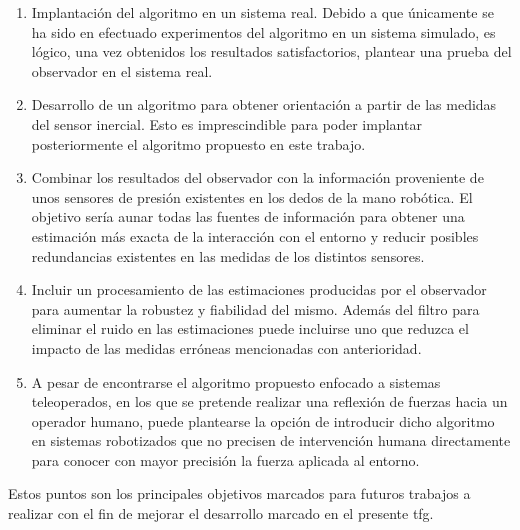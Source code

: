 \begin{enumerate}

\item Implantación del algoritmo en un sistema real. Debido a que únicamente se ha sido en efectuado experimentos del algoritmo en un sistema simulado, es lógico, una vez obtenidos los resultados satisfactorios, plantear una prueba del observador en el sistema real. \par 

\item Desarrollo de un algoritmo para obtener orientación a partir de las medidas del sensor inercial. Esto es imprescindible para poder implantar posteriormente el algoritmo propuesto en este trabajo. \par 

\item Combinar los resultados del observador con la información proveniente de unos sensores de presión existentes en los dedos de la mano robótica. El objetivo sería aunar todas las fuentes de información para obtener una estimación más exacta de la interacción con el entorno y reducir posibles redundancias existentes en las medidas de los distintos sensores. \par 

\item Incluir un procesamiento de las estimaciones producidas por el observador para aumentar la robustez y fiabilidad del mismo. Además del filtro para eliminar el ruido en las estimaciones puede incluirse uno que reduzca el impacto de las medidas erróneas mencionadas con anterioridad. \par 

\item A pesar de encontrarse el algoritmo propuesto enfocado a sistemas teleoperados, en los que se pretende realizar una reflexión de fuerzas hacia un operador humano, puede plantearse la opción de introducir dicho algoritmo en sistemas robotizados que no precisen de intervención humana directamente para conocer con mayor precisión la fuerza aplicada al entorno. \par 

\end{enumerate}

Estos puntos son los principales objetivos marcados para futuros trabajos a realizar con el fin de mejorar el desarrollo marcado en el presente \acrfull{tfg}. \par 